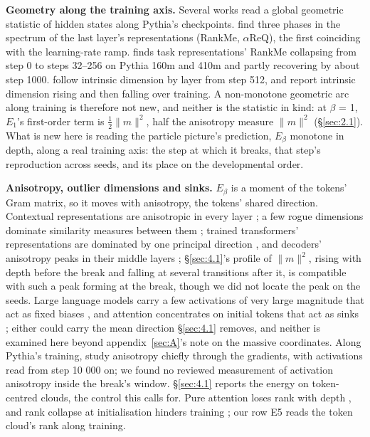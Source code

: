 \documentclass[11pt]{article}
\begin{document}
\textbf{Geometry along the training axis.} Several works read a global geometric statistic of hidden states along Pythia's checkpoints. \citet{li2025} find three phases in the spectrum of the last layer's representations (RankMe, $\alpha $ReQ), the first coinciding with the learning-rate ramp. \citet{billa2026} finds task representations' RankMe collapsing from step 0 to steps 32--256 on Pythia 160m and 410m and partly recovering by about step 1000. \citet{cheng2024} follow intrinsic dimension by layer from step 512, and \citet{razzhigaev2023} report intrinsic dimension rising and then falling over training. A non-monotone geometric arc along training is therefore not new, and neither is the statistic in kind: at $\beta $ = 1, $E_{1}$'s first-order term is $\tfrac12\|m\|^{2}$, half the anisotropy measure $\|m\|^{2}$ (\S\ref{sec:2.1}). What is new here is reading the particle picture's prediction, $E_\beta $ monotone in depth, along a real training axis: the step at which it breaks, that step's reproduction across seeds, and its place on the developmental order.

\textbf{Anisotropy, outlier dimensions and sinks.} $E_\beta $ is a moment of the tokens' Gram matrix, so it moves with anisotropy, the tokens' shared direction. Contextual representations are anisotropic in every layer \citep{ethayarajh2019}; a few rogue dimensions dominate similarity measures between them \citep{timkey2021}; trained transformers' representations are dominated by one principal direction \citep{benartzy2026}, and decoders' anisotropy peaks in their middle layers \citep{razzhigaev2023}; \S\ref{sec:4.1}'s profile of $\|m\|^{2}$, rising with depth before the break and falling at several transitions after it, is compatible with such a peak forming at the break, though we did not locate the peak on the seeds. Large language models carry a few activations of very large magnitude that act as fixed biases \citep{sun2024}, and attention concentrates on initial tokens that act as sinks \citep{xiao2023}; either could carry the mean direction \S\ref{sec:4.1} removes, and neither is examined here beyond appendix~\ref{sec:A}'s note on the massive coordinates. Along Pythia's training, \citet{bernas2026} study anisotropy chiefly through the gradients, with activations read from step 10 000 on; we found no reviewed measurement of activation anisotropy inside the break's window. \S\ref{sec:4.1} reports the energy on token-centred clouds, the control this calls for. Pure attention loses rank with depth \citep{dong2021}, and rank collapse at initialisation hinders training \citep{noci2022}; our row E5 reads the token cloud's rank along training.
\end{document}
